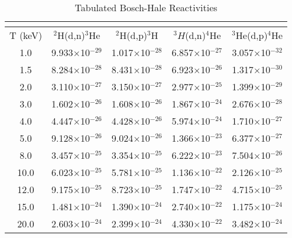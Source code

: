 \begin{table}[h!]\small
  \noindent
  \centering
  \caption{Tabulated Bosch-Hale Reactivities}
  \begin{tabular}{c | c c | c | c}
    \multicolumn{5}{c}{}\\
    \hline
    T (keV) & $^2$H(d,n)$^3$He & $^2$H(d,p)$^3$H & $^3H$(d,n)$^4$He & $^3$He(d,p)$^4$He\\
    \hline\hline
    1.0& 9.933$\times$10$^{-29}$ & 1.017$\times$10$^{-28}$ & 6.857$\times$10$^{-27}$ & 3.057$\times$10$^{-32}$ \\
    1.5  & 8.284$\times$10$^{-28}$ & 8.431$\times$10$^{-28}$ & 6.923$\times$10$^{-26}$ & 1.317$\times$10$^{-30}$ \\
    2.0  & 3.110$\times$10$^{-27}$ & 3.150$\times$10$^{-27}$ & 2.977$\times$10$^{-25}$ & 1.399$\times$10$^{-29}$ \\
    3.0  & 1.602$\times$10$^{-26}$ & 1.608$\times$10$^{-26}$ & 1.867$\times$10$^{-24}$ & 2.676$\times$10$^{-28}$ \\
    4.0  & 4.447$\times$10$^{-26}$ & 4.428$\times$10$^{-26}$ & 5.974$\times$10$^{-24}$ & 1.710$\times$10$^{-27}$ \\
    5.0  & 9.128$\times$10$^{-26}$ & 9.024$\times$10$^{-26}$ & 1.366$\times$10$^{-23}$ & 6.377$\times$10$^{-27}$ \\
    8.0  & 3.457$\times$10$^{-25}$ & 3.354$\times$10$^{-25}$ & 6.222$\times$10$^{-23}$ & 7.504$\times$10$^{-26}$ \\
   10.0  & 6.023$\times$10$^{-25}$ & 5.781$\times$10$^{-25}$ & 1.136$\times$10$^{-22}$ & 2.126$\times$10$^{-25}$ \\
   12.0  & 9.175$\times$10$^{-25}$ & 8.723$\times$10$^{-25}$ & 1.747$\times$10$^{-22}$ & 4.715$\times$10$^{-25}$ \\
   15.0  & 1.481$\times$10$^{-24}$ & 1.390$\times$10$^{-24}$ & 2.740$\times$10$^{-22}$ & 1.175$\times$10$^{-24}$ \\
   20.0& 2.603$\times$10$^{-24}$ & 2.399$\times$10$^{-24}$ & 4.330$\times$10$^{-22}$ & 3.482$\times$10$^{-24}$ \\
   \hline
  \end{tabular}
  \label{table:rr}
\end{table}

